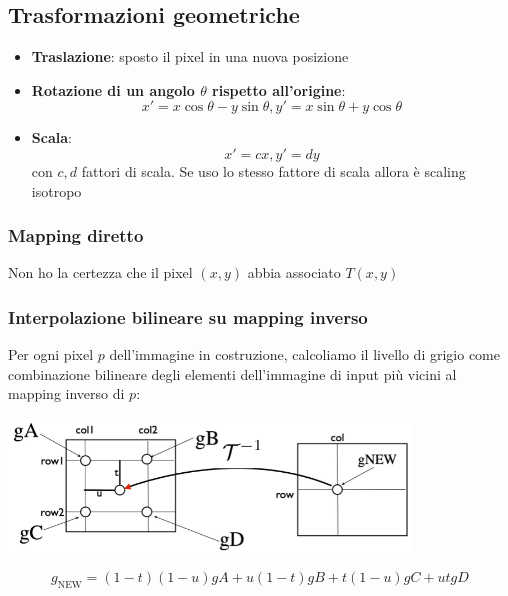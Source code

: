 \documentclass[12pt, a4paper]{report}
\begin{document}
\subsection{Trasformazioni geometriche}
\begin{itemize}
    \item \textbf{Traslazione}: sposto il pixel in una nuova posizione
    \item \textbf{Rotazione di un angolo $\theta$ rispetto all'origine}: \begin{equation*}
        x'=x\cos\theta-y\sin\theta, y'=x\sin\theta+y\cos\theta
    \end{equation*}
    \item \textbf{Scala}: \begin{equation*}
        x'=cx, y'=dy
    \end{equation*} con $c,d$ fattori di scala. Se uso lo stesso fattore di scala allora è scaling isotropo
\end{itemize}
\subsubsection{Mapping diretto}
Non ho la certezza che il pixel $(x,y)$ abbia associato $T(x,y)$
\subsubsection{Interpolazione bilineare su mapping inverso}
Per ogni pixel $p$ dell'immagine in costruzione, calcoliamo il livello di grigio come combinazione bilineare degli elementi dell'immagine di input più vicini al mapping inverso di $p$:
\begin{center}
    \includegraphics[width=0.8\textwidth]{Immagini/interpolazionebilinearemappinginverso.png}
\end{center}
\begin{equation*}
    g_{\text{NEW}}=(1-t)(1-u)gA+u(1-t)gB+t(1-u)gC+utgD
\end{equation*}
\end{document}

